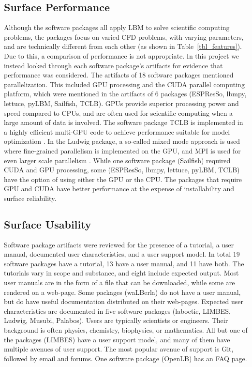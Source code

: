 \documentclass[final, 3p, times, authoryear]{elsarticle}
\begin{document}
\subsection{Surface Performance}

Although the software packages all apply LBM to solve scientific computing
problems, the packages focus on varied CFD problems, with varying parameters,
and are technically different from each other (as shown in
Table~\ref{tbl_features}). Due to this, a comparison of performance is not
appropriate. In this project we instead looked through each software package's
artifacts for evidence that performance was considered. The artifacts of 18
software packages mentioned parallelization. This included GPU processing and
the CUDA parallel computing platform, which were mentioned in the artifacts of 6
packages (ESPResSo, lbmpy, lettuce, pyLBM, Sailfish, TCLB). GPUs provide
superior processing power and speed compared to CPUs, and are often used for
scientific computing when a large amount of data is involved. The software
package TCLB is implemented in a highly efficient multi-GPU code to achieve
performance suitable for model optimization \citep{rutkowski2020open}. In the
Ludwig package, a so-called mixed mode approach is used where fine-grained
parallelism is implemented on the GPU, and MPI is used for even larger scale
parallelism \citep{gray2013ludwig}. While one software package (Sailfish)
required CUDA and GPU processing, some (ESPResSo, lbmpy, lettuce, pyLBM, TCLB)
have the option of using either the GPU or the CPU. The packages that require
GPU and CUDA have better performance at the expense of installability and
surface reliability.

\subsection{Surface Usability}

Software package artifacts were reviewed for the presence of a tutorial, a user
manual, documented user characteristics, and a user support model. In total 19
software packages have a tutorial, 13 have a user manual, and 11 have both. The
tutorials vary in scope and substance, and eight include expected output. Most
user manuals are in the form of a file that can be downloaded, while some are
rendered on a web-page. Some packages (waLBerla) do not have a user manual, but
do have useful documentation distributed on their web-pages. Expected user
characteristics are documented in five software packages (laboetie, LIMBES,
Ludwig, Musubi, Palabos). Users are typically scientists or engineers. Their
background is often physics, chemistry, biophysics, or mathematics. All but one
of the packages (LIMBES) have a user support model, and many of them have
multiple avenues of user support. The most popular avenue of support is Git,
followed by email and forums. One software package (OpenLB) has an FAQ page.    
\end{document}
